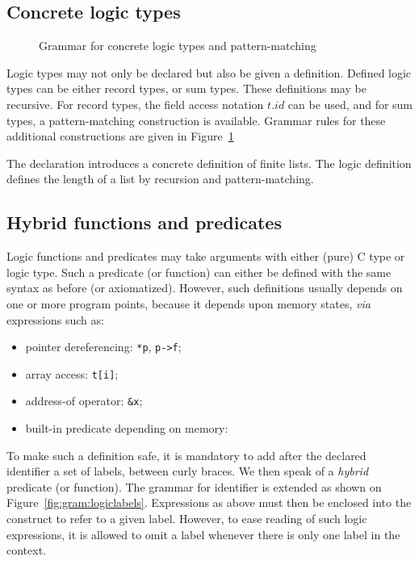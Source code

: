 \subsection{Concrete logic types}\label{sec:concrete-logic-types}
\experimental

\begin{figure}[t]
  \begin{cadre}
      
    \end{cadre}
  \caption{Grammar for concrete logic types and pattern-matching}
\label{fig:gram:logictype}
\end{figure}

Logic types may not only be declared but also be given a
definition. Defined logic types can be either record
types, or sum
types. These definitions may be recursive.
For record types, the field access notation $t.id$ can be used, and
for sum types, a pattern-matching construction is available.
Grammar rules for these additional constructions are given in
Figure~\ref{fig:gram:logictype}

\begin{example}
  The declaration
  introduces a concrete definition of finite lists. The logic definition
  defines the length of a list by recursion and pattern-matching.
\end{example}


\subsection{Hybrid functions and predicates}
\label{sec:logicalstates}

Logic functions and predicates may take arguments with
either (pure) C type or logic
type. Such a predicate (or function)
can either be defined with the same syntax as before (or axiomatized).
However, such definitions usually depends on one or
more program points, because it depends upon memory states, \emph{via}
expressions such as:
\begin{itemize}
\item pointer dereferencing: \lstinline|*p|, \lstinline|p->f|;
\item array access: \lstinline|t[i]|;
\item address-of operator: \lstinline|&x|;
\item built-in predicate depending on memory: \valid
\end{itemize}
To make such a definition safe, it is mandatory to add after the
declared identifier a set of labels, between curly braces. We then speak
of a \textit{hybrid} predicate (or function).
The grammar for identifier is extended as shown on
Figure~\ref{fig:gram:logiclabels}. Expressions
as above must then be enclosed into the \at{} construct to refer to a
given label. However, to ease reading of such logic expressions, it
is allowed to omit a label whenever there is only one label in the
context.

